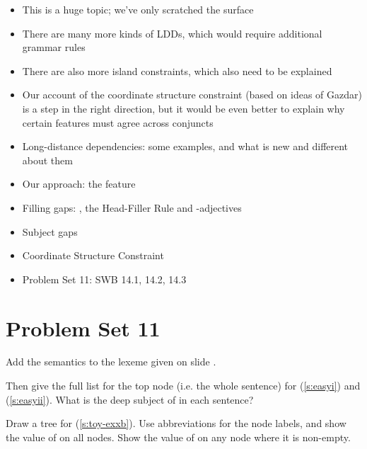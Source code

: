 \documentclass[a4paper,landscape,headrule,footrule]{foils}
\begin{document}
\begin{itemize}
\item This is a huge topic; we've only scratched the
surface
\item There are many more kinds of LDDs, which
would require additional grammar rules
\item There are also more island constraints, which also
need to be explained
\item Our account of the coordinate structure constraint
(based on ideas of Gazdar) is a step in the right
direction, but it would be even better to explain why certain
features must agree across conjuncts
\end{itemize}


\begin{itemize}
\item Long-distance dependencies: some examples, and what is new and
  different about them
\item Our approach: the feature 
\item Filling gaps: , the Head-Filler Rule and
  -adjectives
\item Subject gaps
\item Coordinate Structure Constraint
\item Problem Set 11: SWB 14.1, 14.2, 14.3
\end{itemize}

\section[Problem Set 11: SWB 14.1, 14.2, 14.3]{Problem Set 11}


Add the semantics to the lexeme  given on slide \pageref{l:easy}.

Then give the full  list for the top node (i.e. the whole
sentence) for (\ref{s:easyi}) and (\ref{s:easyii}).  What is the deep
subject of  in each sentence?  

 \begin{exe}
    \ex \label{s:easyi}
    \ex \label{s:easyii}
  \end{exe}

Draw a tree for (\ref{s:toy-exxb}).  
Use abbreviations for the node labels, and show the value of 
on all nodes.  Show the value of  on any node where it is
non-empty.
\end{document}
